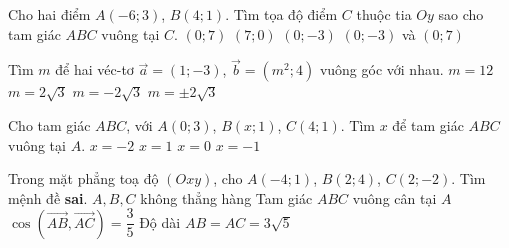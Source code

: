 \begin{ex}%
	Cho hai điểm $A(-6;3)$, $B(4;1)$. Tìm tọa độ điểm $C$ thuộc tia $Oy$ sao cho tam giác $ABC$ vuông tại $C$.
	\choice
	{\True $(0;7)$}
	{$(7;0)$}
	{$(0;-3)$}
	{$(0;-3)$ và $(0;7)$}
\end{ex}

\begin{ex}%
	Tìm $m$ để hai véc-tơ $\overrightarrow{a}=(1;-3)$, $\overrightarrow{b}=(m^2;4)$ vuông góc với nhau.
	\choice
	{$m=12$}
	{$m=2\sqrt{3}$}
	{$m=-2\sqrt{3}$}
	{\True $m=\pm 2\sqrt{3}$}
\end{ex}

\begin{ex}%
	Cho tam giác $ABC$, với $A(0;3)$, $B(x;1)$, $C(4;1)$. Tìm $x$ để tam giác $ABC$ vuông tại $A$.
	\choice
	{$x=-2$}
	{$x=1$}
	{$x=0$ }
	{\True $x=-1$ }
\end{ex}

\begin{ex}%
	Trong mặt phẳng toạ độ $(Oxy)$, cho $A(-4;1)$, $B(2;4)$, $C(2;-2)$. Tìm mệnh đề \textbf{sai}.
	\choice
	{$A, B, C$ không thẳng hàng}
	{\True Tam giác $ABC$ vuông cân tại $A$}
	{$\cos \left(\overrightarrow{AB}, \overrightarrow{AC}\right)=\dfrac{3}{5}$}
	{Độ dài $AB=AC=3\sqrt{5}$}
\end{ex}

